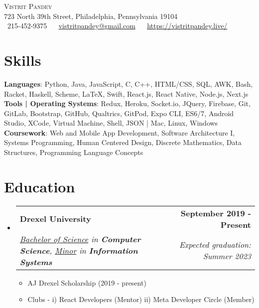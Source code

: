 \documentclass[letterpaper,7pt]{article}
\makeatletter
\newcommand{\resumeItem}[1]{
  \item\small{
    {#1 \vspace{-2pt}}
  }
}
\newcommand{\resumeSubheading}[4]{
  \vspace{-2pt}\item
    \begin{tabular*}{1.0\textwidth}[t]{l@{\extracolsep{\fill}}r}
      \textbf{#1} & \textbf{\small #2} \\
      \textit{\small#3} & \textit{\small #4} \\
    \end{tabular*}\vspace{-7pt}
}
\newcommand{\resumeSubHeadingListStart}{\begin{itemize}[leftmargin=0.0in, label={}]}
\newcommand{\resumeSubHeadingListEnd}{\end{itemize}}
\newcommand{\resumeItemListStart}{\begin{itemize}}
\newcommand{\resumeItemListEnd}{\end{itemize}\vspace{-5pt}}
\makeatother
\begin{document}


\begin{center}

    \vspace{-30pt}
    {\Huge \scshape Vistrit Pandey} \\ \vspace{1pt}
    723 North 39th Street, Philadelphia, Pennsylvania 19104 \\ \vspace{1pt}
    \small \raisebox{-0.1\height}\faPhone\ 215-452-9375 ~ {\raisebox{-0.2\height}\faEnvelope\  \underline{vistritpandey@gmail.com}} ~ {\raisebox{-0.2\height}\Mundus\  \underline{https://vistritpandey.live/}}
    \vspace{5pt}
    
\end{center}

\section{Skills}
 \begin{itemize}[leftmargin=0.15in, label={}]
    \small{\item{
     \textbf{Languages}{: Python, Java, JavaScript, C, C++, HTML/CSS, SQL, AWK, Bash, Racket, Haskell, Scheme, LaTeX, Swift, React.js, React Native, Node.js, Next.js } \\
     \textbf{Tools | Operating Systems}{: Redux, Heroku, Socket.io, JQuery, Firebase, Git, GitLab, Bootstrap, GitHub, Qualtrics, GitPod, Expo CLI, ES6/7, Android Studio, XCode, Virtual Machine, Shell, JSON | Mac, Linux, Windows } \\
     \textbf{Coursework}{: Web and Mobile App Development, Software Architecture I, Systems Programming, Human Centered Design, Discrete Mathematics, Data Structures, Programming Language Concepts}\\
    }}
 \end{itemize}
 \vspace{-16pt}
 
\section{Education}
  \resumeSubHeadingListStart
    \resumeSubheading
      {Drexel University}{September 2019 - Present}
      {\underline{Bachelor of Science} in \textbf{Computer Science}, \underline{Minor} in \textbf{Information Systems}}{Expected graduation: Summer 2023}
      \resumeItemListStart
        \vspace{2pt}
        \resumeItem{AJ Drexel Scholarship (2019 - present)}
        \resumeItem{Clubs - i) React Developers (Mentor) ii) Meta Developer Circle (Member)}
       \resumeItemListEnd  
  \resumeSubHeadingListEnd
\end{document}
